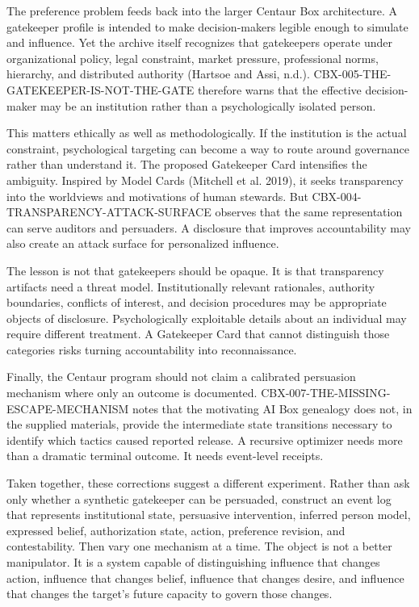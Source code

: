 \documentclass[
  10pt,
]{article}
\begin{document}
The preference problem feeds back into the larger Centaur Box
architecture. A gatekeeper profile is intended to make decision-makers
legible enough to simulate and influence. Yet the archive itself
recognizes that gatekeepers operate under organizational policy, legal
constraint, market pressure, professional norms, hierarchy, and
distributed authority (Hartsoe and Assi, n.d.).
CBX-005-THE-GATEKEEPER-IS-NOT-THE-GATE therefore warns that the
effective decision-maker may be an institution rather than a
psychologically isolated person.

This matters ethically as well as methodologically. If the institution
is the actual constraint, psychological targeting can become a way to
route around governance rather than understand it. The proposed
Gatekeeper Card intensifies the ambiguity. Inspired by Model Cards
(Mitchell et al. 2019), it seeks transparency into the worldviews and
motivations of human stewards. But CBX-004-TRANSPARENCY-ATTACK-SURFACE
observes that the same representation can serve auditors and persuaders.
A disclosure that improves accountability may also create an attack
surface for personalized influence.

The lesson is not that gatekeepers should be opaque. It is that
transparency artifacts need a threat model. Institutionally relevant
rationales, authority boundaries, conflicts of interest, and decision
procedures may be appropriate objects of disclosure. Psychologically
exploitable details about an individual may require different treatment.
A Gatekeeper Card that cannot distinguish those categories risks turning
accountability into reconnaissance.

Finally, the Centaur program should not claim a calibrated persuasion
mechanism where only an outcome is documented.
CBX-007-THE-MISSING-ESCAPE-MECHANISM notes that the motivating AI Box
genealogy does not, in the supplied materials, provide the intermediate
state transitions necessary to identify which tactics caused reported
release. A recursive optimizer needs more than a dramatic terminal
outcome. It needs event-level receipts.

Taken together, these corrections suggest a different experiment. Rather
than ask only whether a synthetic gatekeeper can be persuaded, construct
an event log that represents institutional state, persuasive
intervention, inferred person model, expressed belief, authorization
state, action, preference revision, and contestability. Then vary one
mechanism at a time. The object is not a better manipulator. It is a
system capable of distinguishing influence that changes action,
influence that changes belief, influence that changes desire, and
influence that changes the target's future capacity to govern those
changes.
\end{document}
